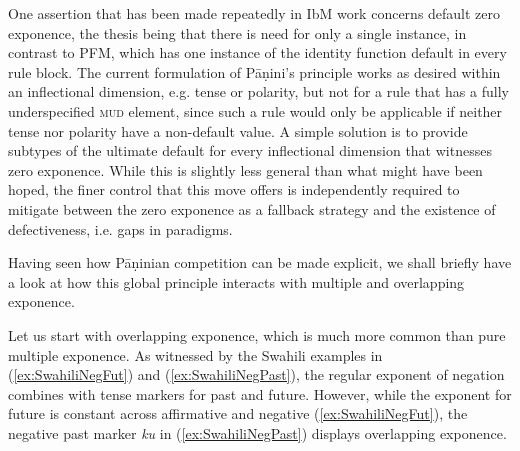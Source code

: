 \documentclass[output=paper
                ,modfonts
                ,nonflat
	        ,collection
	        ,collectionchapter
	        ,collectiontoclongg
 	        ,biblatex
                ,babelshorthands
                ,newtxmath
                ,draftmode
                ,colorlinks, citecolor=brown
] {langscibook}
\begin{document}
{\begin{exe}
\end{exe}

One assertion that has been made repeatedly in IbM work 
concerns default zero exponence, the thesis being that there is need
for only a single instance, in contrast to PFM, which has one instance
of the identity function default in every rule block. The current
formulation of Pāṇini's principle works as desired within an
inflectional dimension, e.g. tense or polarity, but not for a rule
that has a fully underspecified \textsc{mud} element, since such a
rule would only be applicable if neither tense nor polarity have a
non-default value.  A simple solution is to provide subtypes of the
ultimate default for every inflectional dimension that witnesses zero
exponence. While this is slightly less general than what might have
been hoped, the finer control that this move offers is independently
required to mitigate between the zero exponence as a fallback strategy
and the existence of defectiveness, i.e. gaps in paradigms. 

Having seen how Pāṇinian competition can be made explicit, we shall
briefly have a look at how this global principle interacts with
multiple and overlapping exponence. 

Let us start with overlapping exponence, which is much more common
than pure multiple exponence. As witnessed by the Swahili examples in  
(\ref{ex:SwahiliNegFut}) and (\ref{ex:SwahiliNegPast}), the regular
exponent of negation combines with tense markers for past and
future. However, while the exponent for future is constant across
affirmative and negative (\ref{ex:SwahiliNegFut}), the negative past
marker \textit{ku} in (\ref{ex:SwahiliNegPast}) displays overlapping
exponence. 

\begin{exe}
  \ex  \label{ex:SwahiliNegFut}
  \begin{xlist}
  \end{xlist}
  \ex \label{ex:SwahiliNegPast}
  \begin{xlist}
  \end{xlist}


\end{exe}}
\end{document}
